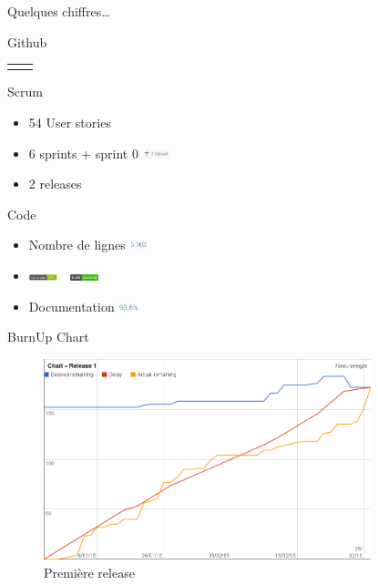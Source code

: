 \begin{frame}{Quelques chiffres\ldots}
\begin{block}{Github}
\begin{tabular}{cc}
\begin{minipage}{0.5\textwidth}
\begin{itemize}
				\end{itemize}
			\end{minipage}
		\end{tabular}
	\end{block}
	\pause
	\begin{block}{Scrum}
				\footnotesize
		\begin{itemize}
			\item 54 User stories
			\item 6 sprints + sprint 0 \includegraphics[height=10px]{images/stats/millestones.png}
			\item 2 releases
		\end{itemize}
	\end{block}
	\pause
	\begin{block}{Code}
				\footnotesize
		\begin{itemize}
			\item Nombre de lignes \includegraphics[height=9px]{images/stats/nblines.jpg}
			\item \includegraphics[height=7px]{images/coverage.png}~~\includegraphics[height=7px]{images/build.png}
			\item Documentation  \includegraphics[height=9px]{images/stats/doc.jpg}
		\end{itemize}
	\end{block}

\end{frame}

\begin{frame}{BurnUp Chart}
	\begin{figure}[H]
		\includegraphics[width=9.5cm]{images/release1Chart.png}
		\caption{Première release}
	\end{figure}
\end{frame}

